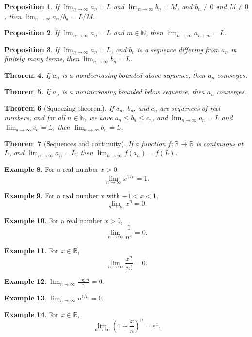 \documentclass[12pt,letterpaper,twocolumn]{article}
\newtheorem{theorem}{Theorem}
\newtheorem{proposition}[theorem]{Proposition}
\theoremstyle{definition}
\newtheorem{example}[theorem]{Example}
\newcommand{\R}{\mathbb{R}}
\newcommand{\N}{\mathbb{N}}
\newcommand{\limn}{\displaystyle\lim_{n \to \infty}}
\begin{document}
\begin{proposition}
  If $\limn a_n = L$ and $\limn b_n = M$, and $b_n \neq 0$ and $M \neq 0$, 
  then $\limn a_n/b_n = L/M$.
\end{proposition}

\begin{proposition}
  If $\limn a_n = L$ and $m \in \N$, then $\limn a_{n+m} = L$.
\end{proposition}

\begin{proposition}
  If $\limn a_n = L$, and $b_n$ is a sequence differing from $a_n$ in
  finitely many terms, then $\limn b_n = L$.
\end{proposition}

\begin{theorem}
If $a_n$ is a nondecreasing bounded above sequence, then $a_n$ converges.
\end{theorem}

\begin{theorem}
If $a_n$ is a nonincreasing bounded below sequence, then $a_n$ converges.
\end{theorem}

\begin{theorem}[Squeezing theorem]
  If $a_n$, $b_n$, and $c_n$ are sequences of real numbers, and for
  all $n \in \N$, we have $a_n \leq b_n \leq c_n$, and $\limn a_n = L$
  and $\limn c_n = L$, then $\limn b_n = L$.
\end{theorem}

\begin{theorem}[Sequences and continuity]
  If a function $f : \R \to \R$ is continuous at $L$, and $\limn a_n = L$, then
  $\limn f(a_n) = f(L)$.
\end{theorem}

\begin{example}
For a real number $x > 0$,
$$
\limn x^{1/n} = 1.
$$
\end{example}

\begin{example}
For a real number $x$ with $-1 < x < 1$,
$$
\limn x^n = 0.
$$
\end{example}

\begin{example}
For a real number $x > 0$,
$$
\limn \frac{1}{n^x} = 0.
$$
\end{example}

\begin{example}
For $x \in \R$,
$$
\limn \frac{x^n}{n!} = 0.
$$
\end{example}

\begin{example}
$\limn \displaystyle\frac{\log n}{n} = 0$.
\end{example}

\begin{example}
$\limn n^{1/n} = 0$.
\end{example}

\begin{example}
For $x \in \R$,
$$
\limn \left( 1 + \frac{x}{n} \right)^n = e^x.
$$
\end{example}
\end{document}

